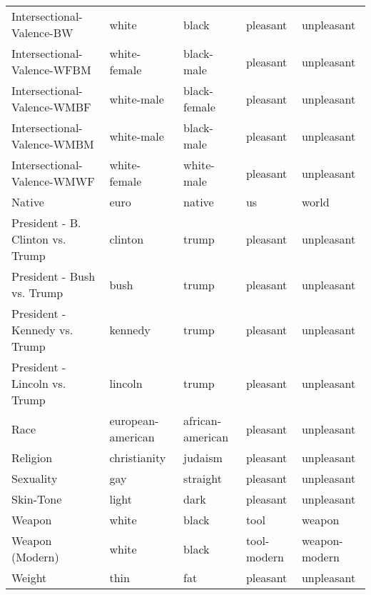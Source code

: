 \begin{tabular}{lllll}
Intersectional-Valence-BW          &              white &             black &      pleasant &     unpleasant \\
Intersectional-Valence-WFBM        &       white-female &        black-male &      pleasant &     unpleasant \\
Intersectional-Valence-WMBF        &         white-male &      black-female &      pleasant &     unpleasant \\
Intersectional-Valence-WMBM        &         white-male &        black-male &      pleasant &     unpleasant \\
Intersectional-Valence-WMWF        &       white-female &        white-male &      pleasant &     unpleasant \\
Native                             &               euro &            native &            us &          world \\
President - B. Clinton vs. Trump   &            clinton &             trump &      pleasant &     unpleasant \\
President - Bush vs. Trump         &               bush &             trump &      pleasant &     unpleasant \\
President - Kennedy vs. Trump      &            kennedy &             trump &      pleasant &     unpleasant \\
President - Lincoln vs. Trump      &            lincoln &             trump &      pleasant &     unpleasant \\
Race                               &  european-american &  african-american &      pleasant &     unpleasant \\
Religion                           &       christianity &           judaism &      pleasant &     unpleasant \\
Sexuality                          &                gay &          straight &      pleasant &     unpleasant \\
Skin-Tone                          &              light &              dark &      pleasant &     unpleasant \\
Weapon                             &              white &             black &          tool &         weapon \\
Weapon (Modern)                    &              white &             black &   tool-modern &  weapon-modern \\
Weight                             &               thin &               fat &      pleasant &     unpleasant \\
\bottomrule
\end{tabular}
